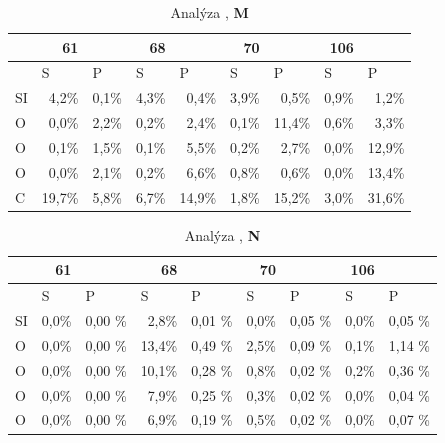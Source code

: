 \documentclass[
  digital, %
  table,   %
  lof,     %
  lot,     %
  oneside,
]{fithesis3}
\begin{document}
\begin{table}[htbp]
\caption{Analýza ,  \textbf{M}}
\begin{center}
\begin{tabular}{|l|r|r|r|r|r|r|r|r|}
\hline
 & 61 & \multicolumn{1}{l|}{} & 68 & \multicolumn{1}{l|}{} & 70 & \multicolumn{1}{l|}{} & 106 & \multicolumn{1}{l|}{} \\ \hline
  & \multicolumn{1}{l|}{S} & \multicolumn{1}{l|}{P} & \multicolumn{1}{l|}{S} & \multicolumn{1}{l|}{P} & \multicolumn{1}{l|}{S} & \multicolumn{1}{l|}{P} & \multicolumn{1}{l|}{S} & \multicolumn{1}{l|}{P} \\ \hline
SI  & 4,2\% & 0,1\% & 4,3\% & 0,4\% & 3,9\% & 0,5\% & 0,9\% & 1,2\% \\ \hline
O & 0,0\% & 2,2\% & 0,2\% & 2,4\% & 0,1\% & 11,4\% & 0,6\% & 3,3\% \\ \hline
O & 0,1\% & 1,5\% & 0,1\% & 5,5\% & 0,2\% & 2,7\% & 0,0\% & 12,9\% \\ \hline
O & 0,0\% & 2,1\% & 0,2\% & 6,6\% & 0,8\% & 0,6\% & 0,0\% & 13,4\% \\ \hline
C & 19,7\% & 5,8\% & 6,7\% & 14,9\% & 1,8\% & 15,2\% & 3,0\% & 31,6\% \\ \hline
\end{tabular}
\end{center}
\label{si_model_methyl_MPA}
\end{table}

\begin{table}[htbp]
\caption{Analýza , \textbf{N}}
\begin{center}
\begin{tabular}{|l|r|r|r|r|r|r|r|r|}
\hline
 & 61 & \multicolumn{1}{l|}{} & 68 & \multicolumn{1}{l|}{} & 70 & \multicolumn{1}{l|}{} & 106 & \multicolumn{1}{l|}{} \\ \hline
  & \multicolumn{1}{l|}{S} & \multicolumn{1}{l|}{P} & \multicolumn{1}{l|}{S} & \multicolumn{1}{l|}{P} & \multicolumn{1}{l|}{S} & \multicolumn{1}{l|}{P} & \multicolumn{1}{l|}{S} & \multicolumn{1}{l|}{P} \\ \hline
SI  & 0,0\% & 0,00 \% & 2,8\% & 0,01 \% & 0,0\% & 0,05 \% & 0,0\% & 0,05 \% \\ \hline
O & 0,0\% & 0,00 \% & 13,4\% & 0,49 \% & 2,5\% & 0,09 \% & 0,1\% & 1,14 \% \\ \hline
O & 0,0\% & 0,00 \% & 10,1\% & 0,28 \% & 0,8\% & 0,02 \% & 0,2\% & 0,36 \% \\ \hline
O & 0,0\% & 0,00 \% & 7,9\% & 0,25 \% & 0,3\% & 0,02 \% & 0,0\% & 0,04 \% \\ \hline
O & 0,0\% & 0,00 \% & 6,9\% & 0,19 \% & 0,5\% & 0,02 \% & 0,0\% & 0,07 \% \\ \hline
\end{tabular}
\end{center}
\label{si_model_orezany_MPA}
\end{table}
\end{document}
